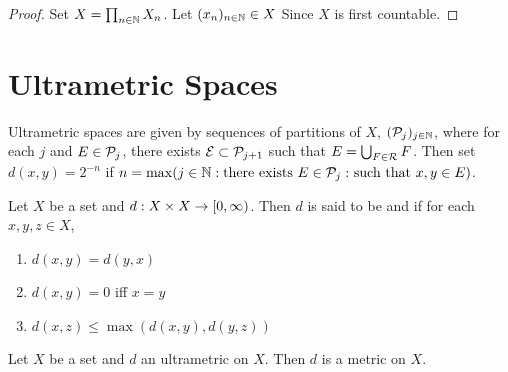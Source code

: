 \documentclass{book}
\begin{document}
\begin{proof}
	Set $X = \prod_{n \in \mathbb{N}} X_n$. Let $(x_n)_{n \in \mathbb{N}} \in X$
	Since $X$ is first countable. 
\end{proof}












































\newpage
\section{Ultrametric Spaces}

Ultrametric spaces are given by sequences of partitions of $X$, $(\mathcal{P}_j)_{j \in \mathbb{N}}$, where for each $j$ and $E \in \mathcal{P}_j$, there exists $\mathcal{E} \subset \mathcal{P}_{j+1}$ such that $E = \bigcup_{F \in \mathcal{R}} F$. Then set $d(x, y) = 2^{-n}$ if $n = \max(j \in \mathbb{N}: \text{there exists $E \in \mathcal{P}_j:$ such that $x,y \in E$})$.

\begin{defn}
	Let $X$ be a set and $d:X \times X \rightarrow [0,\infty)$. Then $d$ is said to be and  if for each $x, y, z \in X$,
	\begin{enumerate}
		\item {} $d(x,y) = d(y,x)$
		\item {} $d(x,y) = 0$ iff $x= y$
		\item {} $d(x,z) \leq \max(d(x,y), d(y,z))$ 
	\end{enumerate} 
 \end{defn}

\begin{ex}
	Let $X$ be a set and $d$ an ultrametric on $X$. Then $d$ is a metric on $X$.
\end{ex}
\end{document}

